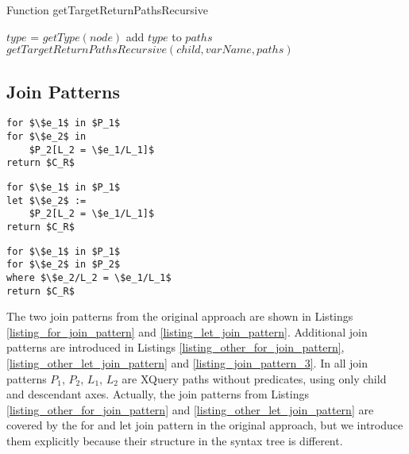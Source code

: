 \begin{algorithm}
\caption{Function getTargetReturnPathsRecursive}
\label{ALG_function_get_target_return_paths_recursive}
\begin{algorithmic}[1]

	\STATE $type$ = $getType(node)$
		\STATE add $type$ to $paths$
	\ENDIF
\ENDIF
{}
	\STATE $getTargetReturnPathsRecursive(child, varName, paths)$
\ENDFOR
\end{algorithmic}
\end{algorithm}


\subsection{Join Patterns}

\begin{lstlisting}[mathescape, float, caption=Other form of the for join pattern., frame=single, label=listing_other_for_join_pattern]
for $\$e_1$ in $P_1$
for $\$e_2$ in
    $P_2[L_2 = \$e_1/L_1]$
return $C_R$
\end{lstlisting}

\begin{lstlisting}[mathescape, float, caption=Other form of the let join pattern., frame=single, label=listing_other_let_join_pattern]
for $\$e_1$ in $P_1$
let $\$e_2$ :=
    $P_2[L_2 = \$e_1/L_1]$
return $C_R$
\end{lstlisting}

\begin{lstlisting}[mathescape, float, caption=Join pattern 3., frame=single, label=listing_join_pattern_3]
for $\$e_1$ in $P_1$
for $\$e_2$ in $P_2$
where $\$e_2/L_2 = \$e_1/L_1$
return $C_R$
\end{lstlisting}

The two join patterns from the original approach are shown in Listings \ref{listing_for_join_pattern} and \ref{listing_let_join_pattern}. Additional join patterns are introduced in Listings \ref{listing_other_for_join_pattern}, \ref{listing_other_let_join_pattern} and \ref{listing_join_pattern_3}. In all join patterns $P_1$, $P_2$, $L_1$, $L_2$ are XQuery paths without predicates, using only child and descendant axes. Actually, the join patterns from Listings \ref{listing_other_for_join_pattern} and \ref{listing_other_let_join_pattern} are covered by the for and let join pattern in the original approach, but we introduce them explicitly because their structure in the syntax tree is different.

